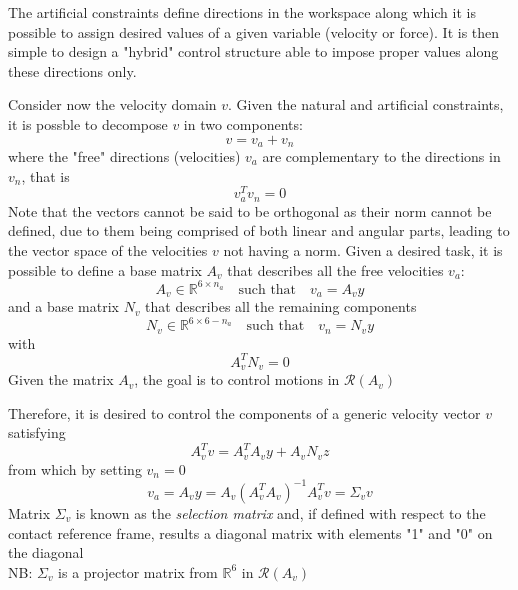 \documentclass{book}
\begin{document}
The artificial constraints define directions in the workspace along which it is possible to assign desired values of a given variable (velocity or force). It is then simple to design a "hybrid" control structure able to impose proper values along these directions only. 

Consider now the velocity domain $v$. Given the natural and artificial constraints, it is possble to decompose $v$ in two components:
\[
    v=v_a+v_n
\]
where the "free" directions (velocities) $v_a$ are complementary to the directions in $v_n$, that is 
\[
    v_a^Tv_n=0
\]
Note that the vectors cannot be said to be orthogonal as their norm cannot be defined, due to them being comprised of both linear and angular parts, leading to the vector space of the velocities $v$ not having a norm. Given a desired task, it is possible to define a base matrix $A_v$ that describes all the free velocities $v_a$:
\[
    A_v\in\mathbb{R}^{6\times n_a} \quad \text{such that} \quad v_a=A_vy 
\]
and a base matrix $N_v$ that describes all the remaining components 
\[
    N_v\in\mathbb{R}^{6\times 6-n_a} \quad \text{such that} \quad v_n=N_vy 
\]
with
\[
    A_v^TN_v=0    
\]
Given the matrix $A_v$, the goal is to control motions in $\mathcal{R}(A_v)$

Therefore, it is desired to control the components of a generic velocity vector $v$ satisfying 
\[
    A_v^Tv=A_v^TA_vy+A_vN_vz
\]
from which by setting $v_n=0$  
\[
    v_a = A_vy=A_v(A_v^TA_v)^{-1}A_v^Tv=\Sigma_vv
\]
Matrix $\Sigma_v$ is known as the \emph{selection matrix} and, if defined with respect to the contact reference frame, results a diagonal matrix with elements "1" and "0" on the diagonal\\
NB: $\Sigma_v$ is a projector matrix from $\mathbb{R}^6$ in $\mathcal{R}(A_v)$
\end{document}
